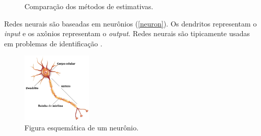 \begin{figure} 
    \caption{Comparação dos métodos de estimativas.} \label{comparation}
     \centering
\end{figure}

Redes neurais são baseadas em neurônios (\autoref{neuron}). Os dendritos representam o \textit{input} e os axônios representam o \textit{output}. Redes neurais são tipicamente usadas em problemas de identificação \cite{samson_intro_ml}.

\begin{figure}[!ht]
	\caption{\label{neuron}Figura esquemática de um neurônio.}
	\begin{center}
		\includegraphics[width=0.3\textwidth]{capitulo_3/neuronio.jpg}
	\end{center}
\end{figure}

